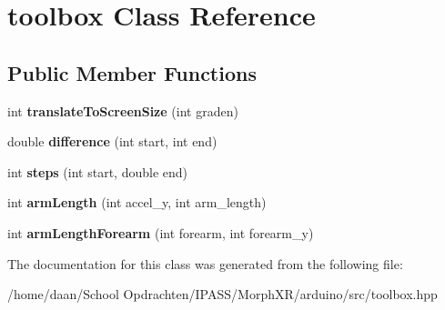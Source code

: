 \hypertarget{classtoolbox}{}\section{toolbox Class Reference}
\label{classtoolbox}
\subsection*{Public Member Functions}
\begin{DoxyCompactItemize}
\item 
\mbox{\label{classtoolbox_a59244902aefc121a12afec6baa8e1e87}} 
int {\bfseries translate\+To\+Screen\+Size} (int graden)
\item 
\mbox{\label{classtoolbox_a99cefed812481a44f45bd795d1c4c1f2}} 
double {\bfseries difference} (int start, int end)
\item 
\mbox{\label{classtoolbox_a4917b28e63e41f052b25297e4d77f2b9}} 
int {\bfseries steps} (int start, double end)
\item 
\mbox{\label{classtoolbox_a9a2412a49c1268f8413c1fb580edc042}} 
int {\bfseries arm\+Length} (int accel\+\_\+y, int arm\+\_\+length)
\item 
\mbox{\label{classtoolbox_a2acc8f839bfb0363e2ef9dd2cb917101}} 
int {\bfseries arm\+Length\+Forearm} (int forearm, int forearm\+\_\+y)
\end{DoxyCompactItemize}


The documentation for this class was generated from the following file\+:\begin{DoxyCompactItemize}
\item 
/home/daan/\+School Opdrachten/\+I\+P\+A\+S\+S/\+Morph\+X\+R/arduino/src/toolbox.\+hpp\end{DoxyCompactItemize}
